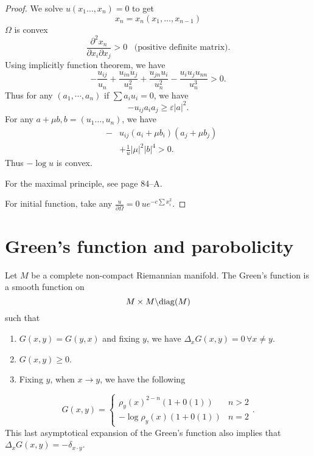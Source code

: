 \begin{proof}
We solve $ u ( x_1 \ldots, x_n) = 0 $ to get 
%
\[ x _n = x_n (x _1 , \ldots , x _{n-1} ) \]
%
$ \Omega$ is convex 
%
\[ \frac{\partial ^ 2 x _n }{\partial x_i \partial x_j} > 0 \;\;\;\mbox{(positive definite matrix)}.\]
%
Using implicitly function theorem, we have 
%
\[ -\frac{u_{ij}}{u_n} + \frac{u_{in} u_j}{u^2_n} + \frac{u_{jn} u_i}{u^2_n} - \frac{u_i u_j u_{nn}}{u_n^3} > 0 .\]
%
Thus for any $ (a _1, \cdots , a_n) $ if $ \sum a _i u_i = 0 $, we have
%
\[ - u _{ij} a _i a_j \geq \varepsilon |a|^2.\]
%
For any $a + \mu b , b = (u _1 \ldots, u_n ) $, we have 
\begin{eqnarray*}
& - & u_{ij} (a_i + \mu b_i )( a_j + \mu b_j ) \\
&& + \frac{1}{u} |\mu | ^2 |b| ^4 > 0 .
\end{eqnarray*}
Thus $ - \log  u$ is convex.

For the maximal principle, see page 84--A. 

For initial function, take any $ \frac{u}{\partial \Omega } = 0 \   u e ^{- c \sum x_i ^2}$.

\end{proof}






\section{Green's function and parobolicity}

Let $M$ be a complete non-compact Riemannian manifold. The Green's function is a smooth function on 
\[ M \times M  \backslash {\rm diag} (M) \]
%
such that 
%
\begin{enumerate}
\item $G (x, y)   =   G (y, x) $ and fixing $ y$, we have $ \Delta _x G (x, y)  = 0 \, \forall x \neq y $. 
\item $G(x, y) \geq 0 $.
\item Fixing $y$, when $ x \rightarrow y$, we have the following 
  \end{enumerate} 
%
\[ G(x, y) = \left\{ \begin{array}{ll} \rho _y (x) ^{2-n} (1 + 0(1) )& n>2 \\
- \log \rho_y (x) (1 + 0(1)) & n = 2 \end{array} \right. .\]
%
This last asymptotical expansion of the Green's function also implies that $ \Delta _x G(x, y) = - \delta _{x \cdot y} $.

